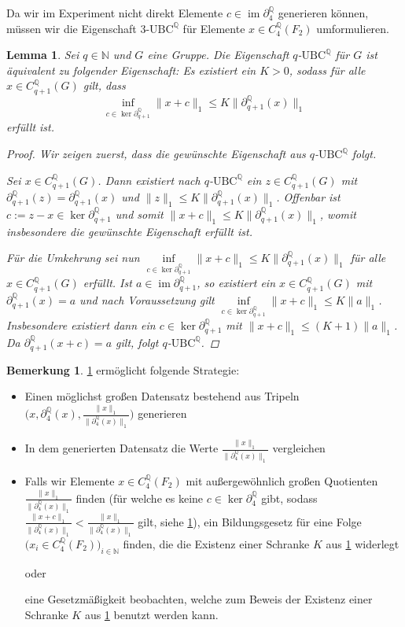 \documentclass[a4paper,twoside,10pt]{scrreprt}
\DeclareMathOperator{\img}{im}
\newcommand{\UBC}{\text{UBC}}
\newcommand{\N}{\mathbb{N}}
\newcommand{\Q}{\mathbb{Q}}
\newtheorem{lemma}[satz]{Lemma}
\theoremstyle{definition}
\newtheorem{bemerkung}[satz]{Bemerkung}
\begin{document}
Da wir im Experiment nicht direkt Elemente $c\in\img\partial_4^{\Q}$ generieren können, müssen wir die Eigenschaft $3$-$\text{UBC}^{\Q}$ für Elemente $x\in C_4^{\Q}(F_2)$ umformulieren. 
\begin{lemma}\label{lem:AltQUBC}
Sei $q\in\N$ und $G$ eine Gruppe.
Die Eigenschaft $q$-$\UBC^{\Q}$ für $G$ ist äquivalent zu folgender Eigenschaft:
Es existiert ein $K>0$, sodass für alle $x\in C_{q+1}^{\Q}(G)$ gilt, dass 
\begin{equation*}
\inf\limits_{c\in\ker\partial_{q+1}^{\Q}}\|x+c\|_1\leq K\|\partial_{q+1}^{\Q}(x)\|_1
\end{equation*}
erfüllt ist.
\begin{proof}
Wir zeigen zuerst, dass die gewünschte Eigenschaft aus $q$-$\text{UBC}^{\Q}$ folgt.\par
Sei $x\in C_{q+1}^{\Q}(G)$. Dann existiert nach $q$-$\text{UBC}^{\Q}$ ein $z\in C_{q+1}^{\Q}(G)$ mit $\partial_{q+1}^{\Q}(z)=\partial_{q+1}^{\Q}(x)$ und $\|z\|_1\leq K\|\partial_{q+1}^{\Q}(x)\|_1$. Offenbar ist $c:=z-x\in\ker\partial_{q+1}^{\Q}$ und somit $\|x+c\|_1\leq K\|\partial_{q+1}^{\Q}(x)\|_1$, womit insbesondere die gewünschte Eigenschaft erfüllt ist.\par
Für die Umkehrung sei nun $\inf\limits_{c\in\ker\partial_{q+1}^{\Q}}\|x+c\|_1\leq K\|\partial_{q+1}^{\Q}(x)\|_1$ für alle $x\in C_{q+1}^{\Q}(G)$ erfüllt. Ist $a\in\img\partial_{q+1}^{\Q}$, so existiert ein $x\in C_{q+1}^{\Q}(G)$ mit $\partial_{q+1}^{\Q}(x)=a$ und
nach Voraussetzung gilt $\inf\limits_{c\in\ker\partial_{q+1}^{\Q}}\|x+c\|_1\leq K\|a\|_1$. Insbesondere existiert dann ein $c\in\ker\partial_{q+1}^{\Q}$ mit $\|x+c\|_1\leq (K+1)\|a\|_1$. Da $\partial_{q+1}^{\Q}(x+c)=a$ gilt, folgt $q$-$\text{UBC}^{\Q}$. 
\end{proof}
\end{lemma}

\begin{bemerkung}\label{bem:strategy}
\cref{lem:AltQUBC} ermöglicht folgende Strategie: 
\begin{itemize}
\item Einen möglichst großen Datensatz bestehend aus Tripeln $\biggl(x,\partial_4^{\Q}(x),\frac{\|x\|_1}{\|\partial_4^{\Q}(x)\|_1}\biggr)$ generieren
\item In dem generierten Datensatz die Werte $\frac{\|x\|_1}{\|\partial_4^{\Q}(x)\|_1}$ vergleichen
\item Falls wir Elemente $x\in C_4^{\Q}(F_2)$ mit außergewöhnlich großen Quotienten $\frac{\|x\|_1}{\|\partial_4^{\Q}(x)\|_1}$ finden (für welche es keine $c\in \ker\partial_4^{\Q}$ gibt, sodass $\frac{\|x+c\|_1}{\|\partial_4^{\Q}(x)\|_1}<\frac{\|x\|_1}{\|\partial_4^{\Q}(x)\|_1}$ gilt, siehe \cref{lem:AltQUBC}), ein Bildungsgesetz für eine Folge $\bigl(x_i\in C_4^{\Q}(F_2)\bigr)_{i\in\N}$ finden, die die Existenz einer Schranke $K$ aus \cref{lem:AltQUBC} widerlegt \par oder \par eine Gesetzmäßigkeit beobachten, welche zum Beweis der Existenz einer Schranke $K$ aus \cref{lem:AltQUBC} benutzt werden kann.
\end{itemize}
\end{bemerkung}
\end{document}
